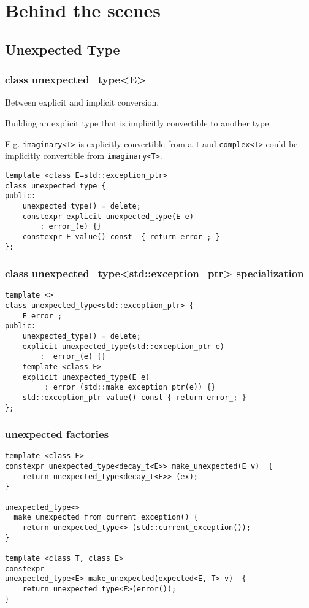 \documentclass[xcolor=dvipsnames]{beamer}
\newcommand{\cpp}[1]{\lstinline{#1}}
\begin{document}

\section{Behind the scenes}

\subsection{Unexpected Type}

\begin{frame}[fragile]
\frametitle{class unexpected\_type<E>}

Between explicit and implicit conversion.

Building an explicit type that is implicitly convertible to another type.

E.g. \cpp{imaginary<T>} is explicitly convertible from a \cpp{T} and \cpp{complex<T>} could be implicitly convertible from \cpp{imaginary<T>}. 

\begin{lstlisting}
template <class E=std::exception_ptr>
class unexpected_type {
public:
    unexpected_type() = delete;
    constexpr explicit unexpected_type(E e) 
        : error_(e) {}   
    constexpr E value() const  { return error_; }                              
}; 
\end{lstlisting}

\end{frame}
\begin{frame}[fragile]
\frametitle{class unexpected\_type<std::exception\_ptr> specialization}

\begin{lstlisting}
template <>
class unexpected_type<std::exception_ptr> {
    E error_;
public:
    unexpected_type() = delete;
    explicit unexpected_type(std::exception_ptr e) 
        :  error_(e) {}
    template <class E>
    explicit unexpected_type(E e) 
         : error_(std::make_exception_ptr(e)) {}     
    std::exception_ptr value() const { return error_; }                              
}; 
\end{lstlisting}

\end{frame}
\begin{frame}[fragile]
\frametitle{unexpected factories}

\begin{lstlisting}
template <class E>
constexpr unexpected_type<decay_t<E>> make_unexpected(E v)  {
    return unexpected_type<decay_t<E>> (ex);
}

unexpected_type<> 
  make_unexpected_from_current_exception() {
    return unexpected_type<> (std::current_exception());
}

template <class T, class E>
constexpr 
unexpected_type<E> make_unexpected(expected<E, T> v)  {
    return unexpected_type<E>(error());
}

\end{lstlisting}
\end{frame}
\end{document}
